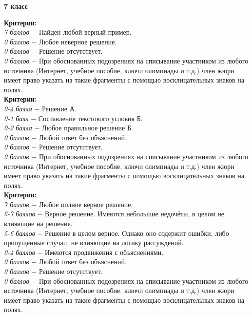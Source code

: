 \centerline{\bf \Huge 7 класс}

 \textbf{Критерии:} \\
\textit{7 баллов} $-$ Найден любой верный пример.\\
\textit{0 баллов} $-$ Любое неверное решение.\\
\textit{0 баллов} $-$ Решение отсутствует.\\
\textit{0 баллов} $-$ При обоснованных подозрениях на списывание участником из любого источника (Интернет, учебное пособие, ключи олимпиады и т.д.) член жюри имеет право указать на такие фрагменты с помощью восклицательных знаков на полях. \\


 \textbf{Критерии:} \\
\textit{0-4 балла} $-$ Решение А.\\
\textit{0-1 балл} $-$ Составление текстового условия Б.\\
\textit{0-2 балла} $-$ Любое правильное решение Б.\\
\textit{0 баллов} $-$ Любой ответ без объяснений.\\
\textit{0 баллов} $-$ Решение отсутствует.\\
\textit{0 баллов} $-$ При обоснованных подозрениях на списывание участником из любого источника (Интернет, учебное пособие, ключи олимпиады и т.д.) член жюри имеет право указать на такие фрагменты с помощью восклицательных знаков на полях. \\


 \textbf{Критерии:} \\
\textit{7 баллов} $-$ Любое полное верное решение.\\
\textit{6-7 баллов} $-$ Верное решение. Имеются небольшие недочёты, в целом не 
влияющие на решение.\\
\textit{5-6 баллов} $-$ Решение в целом верное. Однако оно содержит ошибки, либо пропущенные случаи, не влияющие на логику рассуждений.\\
\textit{0-4 баллов} $-$ Имеются продвижения с объяснениями.\\
\textit{0 баллов} $-$ Любой ответ без объяснений.\\
\textit{0 баллов} $-$ Решение отсутствует.\\
\textit{0 баллов} $-$ При обоснованных подозрениях на списывание участником из любого источника (Интернет, учебное пособие, ключи олимпиады и т.д.) член жюри имеет право указать на такие фрагменты с помощью восклицательных знаков на полях. \\

